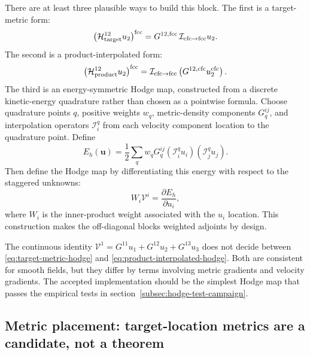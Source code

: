\documentclass[11pt]{article}
\newcommand{\bvec}[1]{\bm{#1}}
\newcommand{\mc}[1]{\mathcal{#1}}
\newcommand{\Interp}{\mc{I}}
\newcommand{\Hodge}{\mc{H}}
\newcommand{\Vflux}{\mc{V}}
\newcommand{\loc}[1]{^{\mathrm{#1}}}
\begin{document}
There are at least three plausible ways to build this block.  The first is a target-metric form:
\begin{equation}
  \left(\Hodge^{12}_{\rm target} u_2\right)\loc{fcc}
  =
  G^{12,\mathrm{fcc}}\,
  \Interp_{\mathrm{cfc}\to\mathrm{fcc}} u_2 .
  \label{eq:target-metric-hodge}
\end{equation}
The second is a product-interpolated form:
\begin{equation}
  \left(\Hodge^{12}_{\rm product} u_2\right)\loc{fcc}
  =
  \Interp_{\mathrm{cfc}\to\mathrm{fcc}}
  \left(G^{12,\mathrm{cfc}}u_2\loc{cfc}\right).
  \label{eq:product-interpolated-hodge}
\end{equation}
The third is an energy-symmetric Hodge map, constructed from a discrete kinetic-energy quadrature rather than chosen as a pointwise formula.  Choose quadrature points \(q\), positive weights \(w_q\), metric-density components \(G^{ij}_q\), and interpolation operators \(\Interp_i^q\) from each velocity component location to the quadrature point.  Define
\begin{equation}
  E_h(\bvec{u})
  =
  \frac12
  \sum_q w_q
  G^{ij}_q
  \left(\Interp_i^q u_i\right)
  \left(\Interp_j^q u_j\right).
  \label{eq:energy-quadrature-hodge}
\end{equation}
Then define the Hodge map by differentiating this energy with respect to the staggered unknowns:
\begin{equation}
  W_i\Vflux^i = \frac{\partial E_h}{\partial u_i},
  \label{eq:hodge-from-energy}
\end{equation}
where \(W_i\) is the inner-product weight associated with the \(u_i\) location.  This construction makes the off-diagonal blocks weighted adjoints by design.

The continuous identity \(\Vflux^1=G^{11}u_1+G^{12}u_2+G^{13}u_3\) does not decide between \eqref{eq:target-metric-hodge} and \eqref{eq:product-interpolated-hodge}.  Both are consistent for smooth fields, but they differ by terms involving metric gradients and velocity gradients.  The accepted implementation should be the simplest Hodge map that passes the empirical tests in section~\ref{subsec:hodge-test-campaign}.

\subsection{Metric placement: target-location metrics are a candidate, not a theorem}
\label{subsec:metric-placement-caveat}
\end{document}
